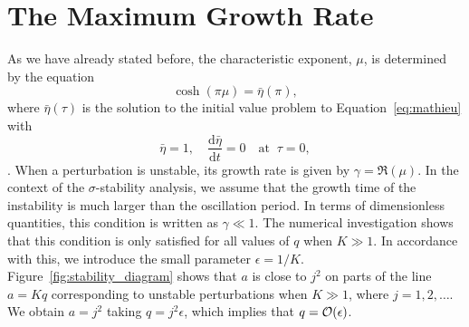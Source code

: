 \documentclass[12pt]{ociamthesis}
\begin{document}
\baselineskip=18pt


\chapter{The Maximum Growth Rate}

As we have already stated before, the characteristic exponent, $\mu$, is determined by the equation
%
\begin{equation}
\label{eq:A1}
\cosh(\pi \mu) = \bar\eta(\pi),
\end{equation}
%
where $\bar\eta(\tau)$ is the solution to the initial value problem to Equation~\eqref{eq:mathieu} with
%
\begin{equation}
\label{eq:A2}
\bar\eta = 1, \quad \frac{\mathrm{d} \bar\eta}{\mathrm{d} t} = 0 \quad 
\mbox{at} \;\; \tau = 0,
\end{equation}
%
\citep{Abramowitz1965}.
When a perturbation is unstable, its growth rate is given by $\gamma = \Re(\mu)$.
In the context of the $\sigma$-stability analysis, we assume that the growth time of the instability is much larger than the oscillation period.
In terms of dimensionless quantities, this condition is written as $\gamma \ll 1$.
The numerical investigation shows that this condition is only satisfied for all values of $q$ when $K \gg 1$.
In accordance with this, we introduce the small parameter $\epsilon = 1 / K$\/.
Figure~\ref{fig:stability_diagram} shows that $a$ is close to $j^2$ on parts of the line $a = Kq$ corresponding to unstable perturbations when $K \gg 1$, where $j = 1,2,\dots$.
We obtain $a = j^2$ taking $q = j^2\epsilon$\/, which implies that $q = {\cal O}(\epsilon)$.
\end{document}
